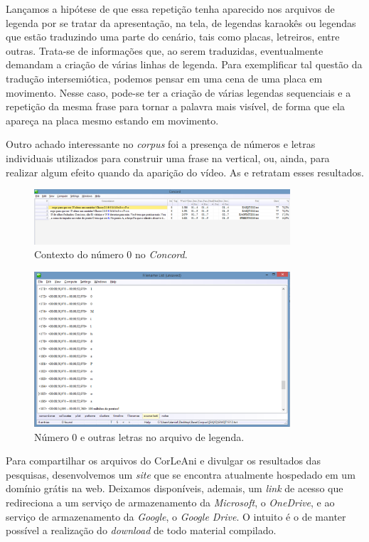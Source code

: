 \documentclass[portuguese]{textolivre}
\begin{document}
Lançamos a hipótese de que essa repetição tenha aparecido nos arquivos de legenda por se tratar da apresentação, na tela, de legendas karaokês ou legendas que estão traduzindo uma parte do cenário, tais como placas, letreiros, entre outras. Trata-se de informações que, ao serem traduzidas, eventualmente demandam a criação de várias linhas de legenda. Para exemplificar tal questão da tradução intersemiótica, podemos pensar em uma cena de uma placa em movimento. Nesse caso, pode-se ter a criação de várias legendas sequenciais e a repetição da mesma frase para tornar a palavra mais visível, de forma que ela apareça na placa mesmo estando em movimento.

Outro achado interessante no \textit{corpus} foi a presença de números e letras individuais utilizados para construir uma frase na vertical, ou, ainda, para realizar algum efeito quando da aparição do vídeo. As  e  retratam esses resultados.

\begin{figure}[htbp]
 \centering
 \includegraphics[width=0.85\textwidth]{Fig36.png}
 \caption{Contexto do número 0 no \textit{Concord}.}
 \label{fig37}
\end{figure}

\begin{figure}[h!]
 \centering
 \includegraphics[width=0.85\textwidth]{Fig37.png}
 \caption{Número 0 e outras letras no arquivo de legenda.}
 \label{fig38}
\end{figure}

Para compartilhar os arquivos do CorLeAni e divulgar os resultados das pesquisas, desenvolvemos um \textit{site} que se encontra atualmente hospedado em um domínio grátis na web. Deixamos disponíveis, ademais, um \textit{link} de acesso que redireciona a um serviço de armazenamento da \textit{Microsoft}, o \textit{OneDrive}, e ao serviço de armazenamento da \textit{Google}, o \textit{Google Drive}. O intuito é o de manter possível a realização do \textit{download} de todo material compilado.
\end{document}
